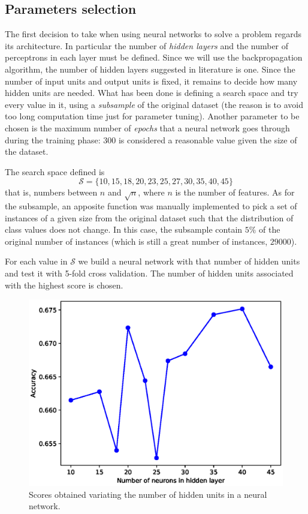\documentclass[a4paper, 10pt]{article}
\begin{document}
\subsection{Parameters selection}
The first decision to take when using neural networks to solve a problem regards its architecture. In particular the number of \emph{hidden layers} and the number of perceptrons in each layer must be defined. Since we will use the backpropagation algorithm, the number of hidden layers suggested in literature is one. Since the number of input units and output units is fixed, it remains to decide how many hidden units are needed. What has been done is defining a search space and try every value in it, using a \emph{subsample} of the original dataset (the reason is to avoid too long computation time just for parameter tuning). Another parameter to be chosen is the maximum number of \emph{epochs} that a neural network goes through during the training phase: $300$ is considered a reasonable value given the size of the dataset.

The search space defined is $$\mathcal{S} = \{10, 15, 18, 20, 23, 25, 27, 30, 35, 40, 45\}$$ that is, numbers between $n$ and $\sqrt{n}$, where $n$ is the number of features. As for the subsample, an apposite function was manually implemented to pick a set of instances of a given size from the original dataset such that the distribution of class values does not change. In this case, the subsample contain $5\%$ of the original number of instances (which is still a great number of instances, $29000$).

For each value in $\mathcal{S}$ we build a neural network with that number of hidden units and test it with 5-fold cross validation. The number of hidden units associated with the highest score is chosen.

\begin{figure}[H]
 \centering
 \includegraphics[width=0.8\linewidth]{pictures/nn_hidden_units.eps}
 \caption{Scores obtained variating the number of hidden units in a neural network.}
 \label{fig:nn_hidden_units}
\end{figure}
\end{document}
